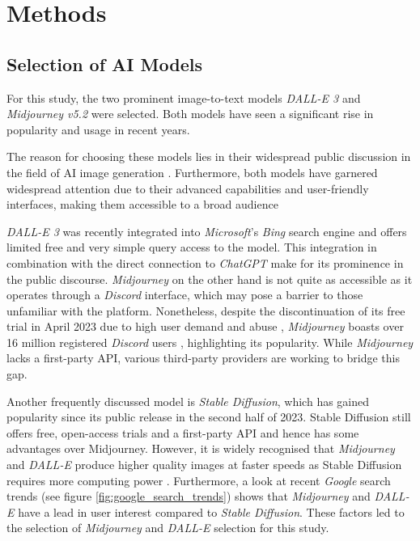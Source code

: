 \section{Methods}

\subsection{Selection of AI Models}
For this study, the two prominent image-to-text models \textit{DALL-E 3} and \textit{Midjourney v5.2} were selected. Both models have seen a significant rise in popularity and usage in recent years. 

The reason for choosing these models lies in their widespread public discussion in the field of AI image generation \parencite{Gibson2023, Gindham2023, Guiness2023}. Furthermore, both models have garnered widespread attention due to their advanced capabilities and user-friendly interfaces, making them accessible to a broad audience

\textit{DALL-E 3} was recently integrated into \textit{Microsoft}'s \textit{Bing} search engine and offers limited free and very simple query access to the \parencite{Bing2024} model. This integration in combination with the direct connection to \textit{ChatGPT} make for its prominence in the public discourse. \textit{Midjourney} on the other hand is not quite as accessible as it operates through a \textit{Discord} interface, which may pose a barrier to those unfamiliar with the platform. Nonetheless, despite the discontinuation of its free trial in April 2023 due to high user demand and abuse \parencite{Weiss2023}, \textit{Midjourney} boasts over 16 million registered \textit{Discord} users \parencite{Krivec2023}, highlighting its popularity. While \textit{Midjourney} lacks a first-party API, various third-party providers are working to bridge this gap. 

Another frequently discussed model is \textit{Stable Diffusion}, which has gained popularity since its public release in the second half of 2023. Stable Diffusion still offers free, open-access trials and a first-party API and hence has some advantages over Midjourney. However, it is widely recognised that \textit{Midjourney} and \textit{DALL-E} produce higher quality images at faster speeds as Stable Diffusion requires more computing power \parencite{Kothari2023}. Furthermore, a look at recent \textit{Google} search trends (see figure \ref{fig:google_search_trends}) shows that \textit{Midjourney} and \textit{DALL-E} have a lead in user interest compared to \textit{Stable Diffusion}. These factors led to the selection of  \textit{Midjourney} and \textit{DALL-E} selection for this study.

